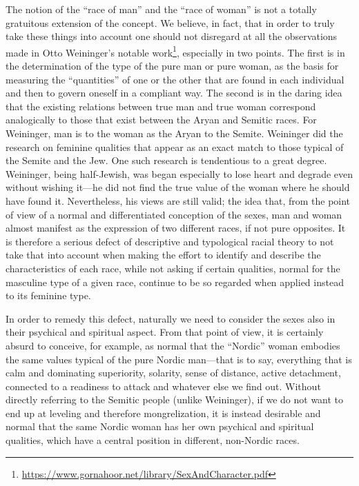 The notion of the ``race of man'' and the ``race of woman'' is not a totally gratuitous extension of the concept. We believe, in fact, that in order to truly take these things into account one should not disregard at all the observations made in Otto Weininger's notable work\footnote{\url{https://www.gornahoor.net/library/SexAndCharacter.pdf}}, especially in two points. The first is in the determination of the type of the pure man or pure woman, as the basis for measuring the ``quantities'' of one or the other that are found in each individual and then to govern oneself in a compliant way. The second is in the daring idea that the existing relations between true man and true woman correspond analogically to those that exist between the Aryan and Semitic races. For Weininger, man is to the woman as the Aryan to the Semite. Weininger did the research on feminine qualities that appear as an exact match to those typical of the Semite and the Jew. One such research is tendentious to a great degree. Weininger, being half-Jewish, was began especially to lose heart and degrade even without wishing it---he did not find the true value of the woman where he should have found it. Nevertheless, his views are still valid; the idea that, from the point of view of a normal and differentiated conception of the sexes, man and woman almost manifest as the expression of two different races, if not pure opposites. It is therefore a serious defect of descriptive and typological racial theory to not take that into account when making the effort to identify and describe the characteristics of each race, while not asking if certain qualities, normal for the masculine type of a given race, continue to be so regarded when applied instead to its feminine type.

In order to remedy this defect, naturally we need to consider the sexes also in their psychical and spiritual aspect. From that point of view, it is certainly absurd to conceive, for example, as normal that the ``Nordic'' woman embodies the same values typical of the pure Nordic man---that is to say, everything that is calm and dominating superiority, solarity, sense of distance, active detachment, connected to a readiness to attack and whatever else we find out. Without directly referring to the Semitic people (unlike Weininger), if we do not want to end up at leveling and therefore mongrelization, it is instead desirable and normal that the same Nordic woman has her own psychical and spiritual qualities, which have a central position in different, non-Nordic races.

